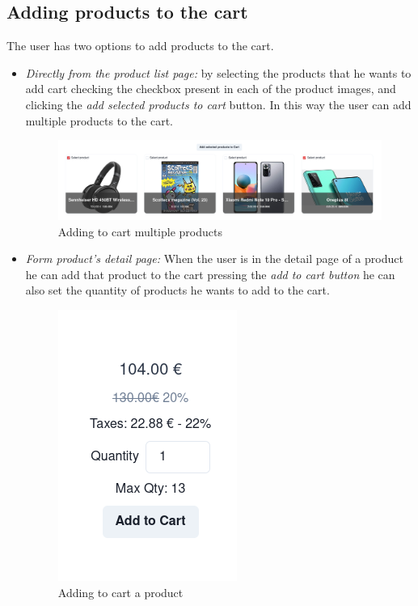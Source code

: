 \subsection{Adding products to the cart}
The user has two options to add products to the cart.
\begin{itemize}
    \item \textit{Directly from the product list page:} by selecting the products that he wants to add cart checking the checkbox present in each of the product images, and clicking the \textit{add selected products to cart} button. In this way the user can add multiple products to the cart.
          \begin{figure}[!ht]
              \caption{Adding to cart multiple products}
              \vspace{10px}
              \includegraphics[scale=0.25]{../../../../Images/userManual/addtoCartPLP.png}
              \centering
          \end{figure}
    \item \textit{Form product's detail page:} When the user is in the detail page of a product he can add that product to the cart pressing the \textit{add to cart button} he can also set the quantity of products he wants to add to the cart.
          \begin{figure}[!ht]
              \caption{Adding to cart a product}
              \vspace{10px}
              \includegraphics[scale=0.5]{../../../../Images/userManual/addToCartPDP.png}
              \centering
          \end{figure}
\end{itemize}
